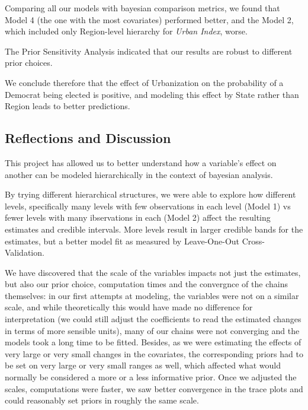 \documentclass[12pt]{article}
\begin{document}
Comparing all our models with bayesian comparison metrics, we found that Model 4 (the one with the most covariates) performed better, and the Model 2, which included only Region-level hierarchy for \textit{Urban Index}, worse. 

The Prior Sensitivity Analysis indicated that our results are robust to different prior choices.

We conclude therefore that the effect of Urbanization on the probability of a Democrat being elected is positive, and modeling this effect by State rather than Region leads to better predictions.



\subsection{Reflections and Discussion}

This project has allowed us to better understand how a variable's effect on another can be modeled hierarchically in the context of bayesian analysis.


By trying different hierarchical structures, we were able to explore how different levels, specifically many levels with few observations in each level (Model 1) vs fewer levels with many ibservations in each (Model 2) affect the resulting estimates and credible intervals. More levels result in larger credible bands for the estimates, but a better model fit as measured by Leave-One-Out Cross-Validation. 

We have discovered that the scale of the variables impacts not just the estimates, but also our prior choice, computation times and the convergnce of the chains themselves: in our first attempts at modeling, the variables were not on a similar scale, and while theoretically this would have made no difference for interpretation (we could still adjust the coefficients to read the estimated changes in terms of more sensible units), many of our chains were not converging and the models took a long time to be fitted.
Besides, as we were estimating the effects of very large or very small changes in the covariates, the corresponding priors had to be set on very large or very small ranges as well, which affected what would normally be considered a more or a less informative prior. Once we adjusted the scales, computations were faster, we saw better convergence in the trace plots and could reasonably set priors in roughly the same scale.
\end{document}
